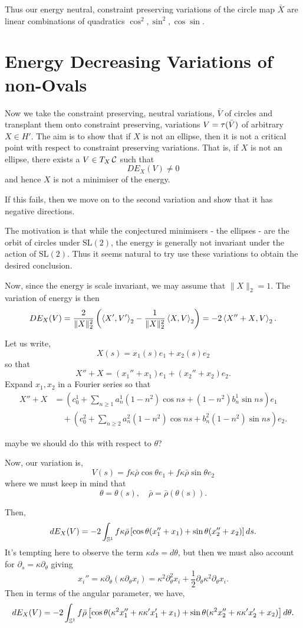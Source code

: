 \documentclass[12pt]{article}
\begin{document}
Thus our energy neutral, constraint preserving variations of the circle map \(\bar{X}\) are linear combinations of quadratics \(\cos^2, \sin^2, \cos \sin\).

\section{Energy Decreasing Variations of non-Ovals}

Now we take the constraint preserving, neutral variations, \(\bar{V}\) of circles and transplant them onto constraint preserving, variations \(V = \operatorname{\tau}(\bar{V})\) of arbitrary \(X \in H'\). The aim is to show that if \(X\) is not an ellipse, then it is not a critical point with respect to constraint preserving variations. That is, if \(X\) is not an ellipse, there exists a \(V \in T_X \operatorname{\mathcal{C}}\) such that
\[
DE_X (V) \ne 0
\]
and hence \(X\) is not a minimiser of the energy.

{\color{red} If this fails, then we move on to the second variation and show that it has negative directions.}

The motivation is that while the conjectured minimisers - the ellipses - are the orbit of circles under \(\text{SL}(2)\), the energy is generally not invariant under the action of \(\text{SL}(2)\). Thus it seems natural to try use these variations to obtain the desired conclusion.

Now, since the energy is scale invariant, we may assume that \(\|X\|_2 = 1\). The variation of energy is then
\[
DE_X (V) = \frac{2}{\|X\|_2^2} \left(\left\langle{X'},{V'}\right\rangle_2 - \frac{1}{\|X\|_2^2}\left\langle{X},{V}\right\rangle_2\right) = -2 \left\langle{X'' + X},{V}\right\rangle_2.
\]

Let us write,
\[
X(s) = x_1(s) e_1 + x_2(s) e_2
\]
so that
\[
X'' + X = (x_1'' + x_1)e_1 + (x_2'' + x_2)e_2.
\]
Expand \(x_1, x_2\) in a Fourier series so that
\[
\begin{split}
X'' + X &= (c_0^1 + \sum_{n\geq 1} a_n^1 (1-n^2)\cos ns + (1-n^2)b_n^1 \sin ns) e_1 \\
&\quad + (c_0^2 + \sum_{n\geq 2} a_n^2 (1-n^2)\cos ns + b_n^2 (1-n^2) \sin ns) e_2.
\end{split}
\]

{\color{red} maybe we should do this with respect to \(\theta\)?}

Now, our variation is,
\[
V(s) = f\kappa\bar{\rho} \cos\theta e_1 + f\kappa\bar{\rho} \sin\theta e_2
\]
where we must keep in mind that
\[
\theta = \theta(s), \quad \bar{\rho} = \bar{\rho}(\theta(s)).
\]

Then,
\[
dE_X (V) = -2 \int_{\operatorname{\mathbb{S}^1}} f\kappa\bar{\rho} \left[\cos\theta (x_1'' + x_1) + \sin\theta (x_2'' + x_2) \right] ds.
\]
It's tempting here to observe the term \(\kappa ds = d\theta\), but then we must also account for \(\partial_s = \kappa \partial_{\theta}\) giving
\[
x_i'' = \kappa \partial_{\theta} (\kappa \partial_\theta x_i) = \kappa^2 \partial_{\theta}^2 x_i + \frac{1}{2} \partial_{\theta} \kappa^2 \partial_{\theta} x_i.
\]
Then in terms of the angular parameter, we have,
\[
dE_X (V) = -2 \int_{\operatorname{\mathbb{S}^1}} f \bar{\rho} \left[\cos\theta (\kappa^2 x_1'' + \kappa\kappa' x_1 ' + x_1) + \sin\theta (\kappa^2 x_2'' + \kappa\kappa' x_2 ' + x_2) \right] d\theta.
\]
\end{document}
